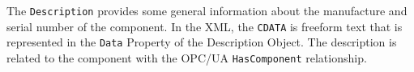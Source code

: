 
The \texttt{Description} provides some general information about the 
manufacture and serial number of the component. In the XML, the \texttt{CDATA} is freeform text that is represented in the \texttt{Data} Property of the Description Object. The description is related to the component with the OPC/UA \texttt{HasComponent} relationship.